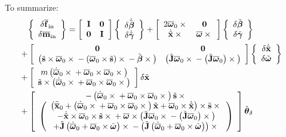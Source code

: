 \documentclass[10pt,dvips,fleqn,subeqn]{report}
\newcommand{\T}[1]{\bm{\mathbf{#1}}}
\newcommand{\TT}[1]{\bm{\mathbf{#1}}}
\begin{document}
To summarize:
\begin{align}
	\cubr{\cvvect{
		\delta\overline{\T{f}}_{\text{in}} \\
		\delta\overline{\T{m}}_{\text{in}}
	}} &= \sqbr{\matr{cc}{
		\TT{I} & \TT{0} \\
		\TT{0} & \TT{I}
	}} \cubr{\cvvect{
		\delta\dot{\tilde{\T{\beta}}} \\
		\delta\dot{\tilde{\T{\gamma}}}
	}} + \sqbr{\matr{cc}{
		2 \overline{\T{\omega}}_0 \times{} & \TT{0} \\
		\dot{\tilde{\T{x}}} \times{} & \overline{\T{\omega}} \times{}
	}} \cubr{\cvvect{
		\delta\tilde{\T{\beta}} \\
		\delta\tilde{\T{\gamma}}
	}}
	\nonumber \\ & \hspace{-20mm}
	+ \sqbr{\matr{cc}{
		\TT{0} & \TT{0} \\
		\plbr{
			\tilde{\T{s}} \times \overline{\T{\omega}}_0 \times{}
			- \plbr{\overline{\T{\omega}}_0 \times \tilde{\T{s}}} \times{}
			- \tilde{\T{\beta}} \times{}
		}
		& \plbr{
			\tilde{\TT{J}} \overline{\T{\omega}}_0 \times{}
			- \plbr{\tilde{\TT{J}} \overline{\T{\omega}}_0} \times{}
		}
	}} \cubr{\cvvect{
		\delta\dot{\tilde{\T{x}}} \\
		\delta\tilde{\T{\omega}}
	}}
	\nonumber \\ & \hspace{-20mm}
	+ \sqbr{\matr{c}{
		m \plbr{
			\dot{\overline{\T{\omega}}}_0 \times{}
			+ \overline{\T{\omega}}_0 \times \overline{\T{\omega}}_0 \times{}
		} \\
		\tilde{\T{s}} \times \plbr{
			\dot{\overline{\T{\omega}}}_0 \times{}
			+ \overline{\T{\omega}}_0 \times \overline{\T{\omega}}_0 \times{}
		}
	}} \delta\tilde{\T{x}}
	\nonumber \\ & \hspace{-20mm}
	+ \sqbr{\matr{c}{
		- \plbr{
			\dot{\overline{\T{\omega}}}_0 \times{}
			+ \overline{\T{\omega}}_0 \times \overline{\T{\omega}}_0 \times{}
		} \tilde{\T{s}} \times{} \\
		\plbr{\cvvect{
			\plbr{
				\ddot{\overline{\T{x}}}_0
				+ \plbr{
					\dot{\overline{\T{\omega}}}_0 \times{}
					+ \overline{\T{\omega}}_0 \times \overline{\T{\omega}}_0 \times{}
				} \tilde{\T{x}}
				+ \overline{\T{\omega}}_0 \times \dot{\tilde{\T{x}}}
			} \times \tilde{\T{s}} \times{} \\
			- \dot{\tilde{\T{x}}} \times \overline{\T{\omega}}_0 \times \tilde{\T{s}} \times{}
			+ \overline{\T{\omega}} \times \plbr{
				\tilde{\TT{J}} \overline{\T{\omega}}_0 \times{}
				- \plbr{\tilde{\TT{J}} \overline{\T{\omega}}_0} \times{}
			} \\
			+ \tilde{\TT{J}} \plbr{
				\dot{\overline{\T{\omega}}}_0
				+ \overline{\T{\omega}}_0 \times \tilde{\T{\omega}}
			} \times{}
			- \plbr{\tilde{\TT{J}} \plbr{
				\dot{\overline{\T{\omega}}}_0
				+ \overline{\T{\omega}}_0 \times \tilde{\T{\omega}}
			}} \times{}
		}}
	}} \tilde{\T{\theta}}_{\delta}
\end{align}
\end{document}
